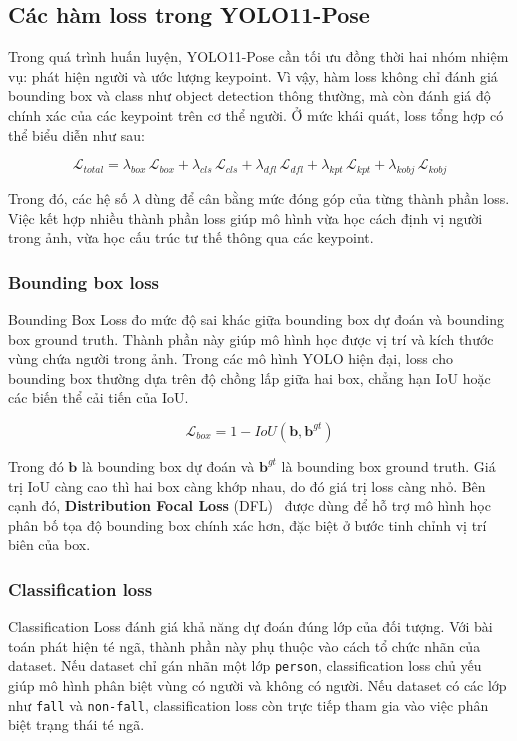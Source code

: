 \documentclass[12pt, a4paper]{article}
\begin{document}
\subsection{Các hàm loss trong YOLO11-Pose}

Trong quá trình huấn luyện, YOLO11-Pose cần tối ưu đồng thời hai nhóm nhiệm vụ: phát hiện người và ước lượng keypoint.
Vì vậy, hàm loss không chỉ đánh giá bounding box và class như object detection thông thường, mà còn đánh giá độ chính xác của các keypoint trên cơ thể người.
Ở mức khái quát, loss tổng hợp có thể biểu diễn như sau:

\begin{equation}
  \mathcal{L}_{total} = \lambda_{box}\,\mathcal{L}_{box}
                      + \lambda_{cls}\,\mathcal{L}_{cls}
                      + \lambda_{dfl}\,\mathcal{L}_{dfl}
                      + \lambda_{kpt}\,\mathcal{L}_{kpt}
                      + \lambda_{kobj}\,\mathcal{L}_{kobj}
  \label{eq:total_loss}
\end{equation}

Trong đó, các hệ số $\lambda$ dùng để cân bằng mức đóng góp của từng thành phần loss.
Việc kết hợp nhiều thành phần loss giúp mô hình vừa học cách định vị người trong ảnh, vừa học cấu trúc tư thế thông qua các keypoint.

\subsubsection{Bounding box loss}
Bounding Box Loss đo mức độ sai khác giữa bounding box dự đoán và bounding box ground truth.
Thành phần này giúp mô hình học được vị trí và kích thước vùng chứa người trong ảnh.
Trong các mô hình YOLO hiện đại, loss cho bounding box thường dựa trên độ chồng lấp giữa hai box, chẳng hạn IoU hoặc các biến thể cải tiến của IoU.

\begin{equation}
  \mathcal{L}_{box} = 1 - IoU(\mathbf{b}, \mathbf{b}^{gt})
\end{equation}

Trong đó $\mathbf{b}$ là bounding box dự đoán và $\mathbf{b}^{gt}$ là bounding box ground truth.
Giá trị IoU càng cao thì hai box càng khớp nhau, do đó giá trị loss càng nhỏ.
Bên cạnh đó, \textbf{Distribution Focal Loss} (DFL)~\cite{li2020generalized} được dùng để hỗ trợ mô hình học phân bố tọa độ bounding box chính xác hơn, đặc biệt ở bước tinh chỉnh vị trí biên của box.

\subsubsection{Classification loss}
Classification Loss đánh giá khả năng dự đoán đúng lớp của đối tượng.
Với bài toán phát hiện té ngã, thành phần này phụ thuộc vào cách tổ chức nhãn của dataset.
Nếu dataset chỉ gán nhãn một lớp \texttt{person}, classification loss chủ yếu giúp mô hình phân biệt vùng có người và không có người.
Nếu dataset có các lớp như \texttt{fall} và \texttt{non-fall}, classification loss còn trực tiếp tham gia vào việc phân biệt trạng thái té ngã.
\end{document}
